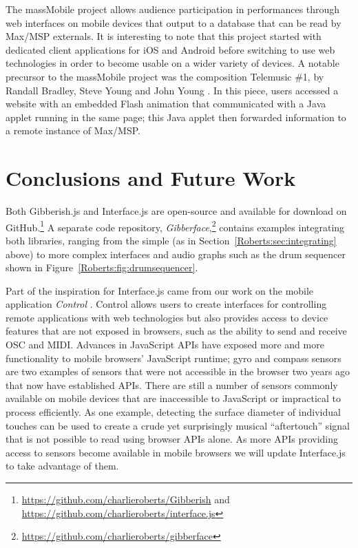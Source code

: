 The massMobile project  \cite{Weitzner:2012} allows audience participation in performances through web interfaces on mobile devices that output to a database that can be read by Max/MSP externals. It is interesting to note that this project started with dedicated client applications for iOS and Android before switching to use web technologies in order to become usable on a wider variety of devices. A notable precursor to the massMobile project was the composition Telemusic \#1, by Randall Bradley, Steve Young and John Young \cite{Young:2001}. In this piece, users accessed a website with an embedded Flash animation that communicated with a Java applet running in the same page; this Java applet then forwarded information to a remote instance of Max/MSP.

\section{Conclusions and Future Work}
Both Gibberish.js and Interface.js are open-source and available for download on GitHub.\footnote{\url{https://github.com/charlieroberts/Gibberish} and \url{https://github.com/charlieroberts/interface.js}} A separate code repository, \emph{Gibberface},\footnote{\url{https://github.com/charlieroberts/gibberface}} contains examples integrating both libraries, ranging from the simple (as in Section~\ref{Roberts:sec:integrating} above) to more complex interfaces and audio graphs such as the drum sequencer shown in Figure~\ref{Roberts:fig:drumsequencer}.

Part of the inspiration for Interface.js came from our work on the mobile application \emph{Control} \cite{Wright:2005}. Control allows users to create interfaces for controlling remote applications with web technologies but also provides access to device features that are not exposed in browsers, such as the ability to send and receive OSC and MIDI. Advances in JavaScript APIs have exposed more and more functionality to mobile browsers' JavaScript runtime; gyro and compass sensors are two examples of sensors that were not accessible in the browser two years ago that now have established APIs. There are still a number of sensors commonly available on mobile devices that are inaccessible to JavaScript or impractical to process efficiently. As one example, detecting the surface diameter of individual touches can be used to create a crude yet surprisingly musical ``aftertouch'' signal that is not possible to read using browser APIs alone. As more APIs providing access to sensors become available in mobile browsers we will update Interface.js to take advantage of them.

